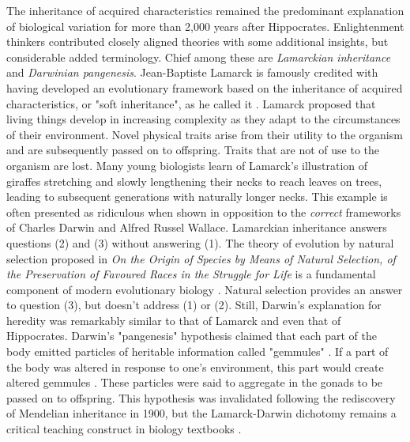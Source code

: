 The inheritance of acquired characteristics remained the predominant explanation of biological variation for more than 2,000 years after Hippocrates. Enlightenment thinkers contributed closely aligned theories with some additional insights, but considerable added terminology. Chief among these are \textit{Lamarckian inheritance} and \textit{Darwinian pangenesis}. Jean-Baptiste Lamarck is famously credited with having developed an evolutionary framework based on the inheritance of acquired characteristics, or "soft inheritance", as he called it  \cite{lamarck_zoological_1914}. Lamarck proposed that living things develop in increasing complexity as they adapt to the circumstances of their environment. Novel physical traits arise from their utility to the organism and are subsequently passed on to offspring. Traits that are not of use to the organism are lost. Many young biologists learn of Lamarck's illustration of giraffes stretching and slowly lengthening their necks to reach leaves on trees, leading to subsequent generations with naturally longer necks. This example is often presented as ridiculous when shown in opposition to the \textit{correct} frameworks of Charles Darwin and Alfred Russel Wallace. Lamarckian inheritance answers questions (2) and (3) without answering (1). The theory of evolution by natural selection proposed in \textit{On the Origin of Species by Means of Natural Selection, of the Preservation of Favoured Races in the Struggle for Life} is a fundamental component of modern evolutionary biology \cite{darwin_origin_1936}. Natural selection provides an answer to question (3), but doesn't address (1) or (2). Still, Darwin's explanation for heredity was remarkably similar to that of Lamarck and even that of Hippocrates. Darwin's "pangenesis" hypothesis claimed that each part of the body emitted particles of heritable information called "gemmules" \cite{darwin_variation_2010}.  If a part of the body was altered in response to one's environment, this part would create altered gemmules \cite{darwin_pangenesis_1871}. These particles were said to aggregate in the gonads to be passed on to offspring.  This hypothesis was invalidated following the rediscovery of Mendelian inheritance in 1900, but the Lamarck-Darwin dichotomy remains a critical teaching construct in biology textbooks \cite{holterhoff_history_2014} \cite{zirkle_inheritance_1935}. 


